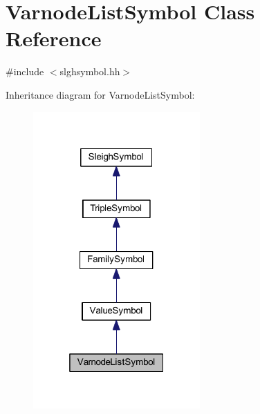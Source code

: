 \hypertarget{class_varnode_list_symbol}{}\section{Varnode\+List\+Symbol Class Reference}
\label{class_varnode_list_symbol}


{\ttfamily \#include $<$slghsymbol.\+hh$>$}



Inheritance diagram for Varnode\+List\+Symbol\+:
\nopagebreak
\begin{figure}[H]
\begin{center}
\leavevmode
\includegraphics[width=181pt]{class_varnode_list_symbol__inherit__graph}
\end{center}
\end{figure}


